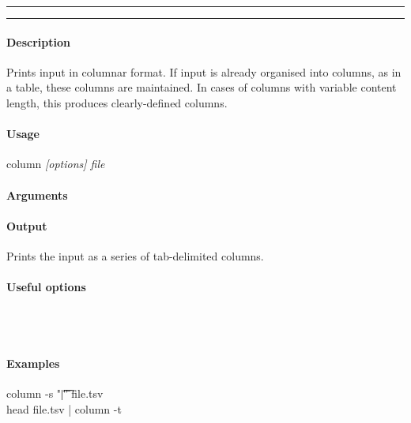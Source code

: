 \hrule
\vspace{1mm}
\hrule
\vspace{4mm}

\paragraph{Description}
\indentpar \raggedright \textrm{Prints input in columnar format. If input is already organised into columns, as in a table, these columns are maintained. In cases of columns with variable content length, this produces clearly-defined columns.}\\

\paragraph{Usage}
\indentpar column \textit{[options] file}

\paragraph{Arguments}
\indentpar {}

\paragraph{Output}
\indentpar \textrm{Prints the input as a series of tab-delimited columns.}

\paragraph{Useful options}
\indentpar {}\\
\indentpar {}\\
\indentpar {}



\paragraph{Examples}

\indentpar column -s "\t|\t" file.tsv\\
\indentpar head file.tsv | column -t

\vspace{20mm}